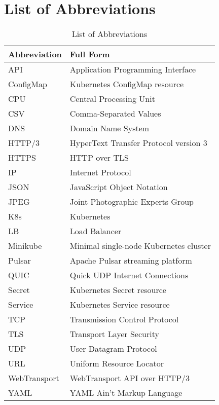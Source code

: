 \chapter{List of Abbreviations}
\begin{table}[h!]
\centering
\begin{tabular}{p{2.5cm} p{12.5cm}}
\textbf{Abbreviation} & \textbf{Full Form} \\ \hline
API                  & Application Programming Interface \\
ConfigMap           & Kubernetes ConfigMap resource \\
CPU                 & Central Processing Unit \\
CSV                 & Comma-Separated Values \\
DNS                 & Domain Name System \\
HTTP/3              & HyperText Transfer Protocol version 3 \\
HTTPS               & HTTP over TLS \\
IP                  & Internet Protocol \\
JSON                & JavaScript Object Notation \\
JPEG                & Joint Photographic Experts Group \\
K8s                 & Kubernetes \\
LB                  & Load Balancer \\
Minikube            & Minimal single-node Kubernetes cluster \\
Pulsar              & Apache Pulsar streaming platform \\
QUIC                & Quick UDP Internet Connections \\
Secret              & Kubernetes Secret resource \\
Service             & Kubernetes Service resource \\
TCP                 & Transmission Control Protocol \\
TLS                 & Transport Layer Security \\
UDP                 & User Datagram Protocol \\
URL                 & Uniform Resource Locator \\
WebTransport        & WebTransport API over HTTP/3 \\
YAML                & YAML Ain’t Markup Language \\ \hline
\end{tabular}
\caption{List of Abbreviations}
\label{tab:abbreviations}
\end{table}

